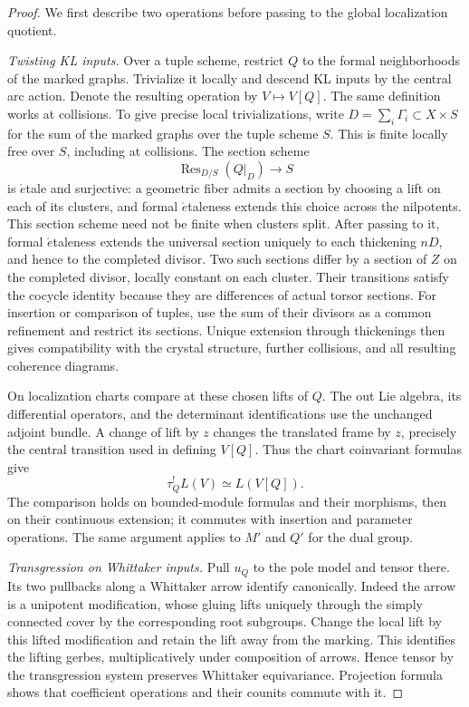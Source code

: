 \begin{proof}
We first describe two operations before passing to the global
localization quotient.

\emph{Twisting KL inputs.}
Over a tuple scheme, restrict \(Q\) to the formal neighborhoods of
the marked graphs.  Trivialize it locally and descend KL inputs by the
central arc action.  Denote the resulting operation by \(V\mapsto
V[Q]\).  The same definition works at collisions.  To give precise local
trivializations, write \(D=\sum_i\Gamma_i\subset X\times S\)
for the sum of the marked graphs over the tuple scheme \(S\).
This is finite locally free over \(S\), including at collisions.
The section scheme
\[
 \operatorname{Res}_{D/S}(Q|_D)\longrightarrow S
\]
is \(\acute{e}\)tale and surjective: a geometric fiber admits a
section by choosing a lift on each of its clusters, and formal
\(\acute{e}\)taleness extends this choice across the nilpotents.
This section scheme need not be finite when clusters split.
After passing to it, formal \(\acute{e}\)taleness extends the
universal section uniquely to each thickening \(nD\), and hence
to the completed divisor.  Two such sections differ by a section
of \(Z\) on the completed divisor, locally constant on each
cluster.  Their transitions satisfy the cocycle identity because
they are differences of actual torsor sections.  For insertion or
comparison of tuples, use the sum of their divisors as a common
refinement and restrict its sections.  Unique extension through
thickenings then gives compatibility with the crystal structure,
further collisions, and all resulting coherence diagrams.

On localization charts compare at these chosen lifts of \(Q\).
The out Lie algebra, its differential operators, and the determinant
identifications use the unchanged adjoint bundle.  A change of lift
by \(z\) changes the translated frame by \(z\), precisely the
central transition used in defining \(V[Q]\).  Thus the chart
coinvariant formulas give
\[
 \tau_Q^!L(V)\simeq L(V[Q]).
\]
The comparison holds on bounded-module formulas and their morphisms,
then on their continuous extension; it commutes with insertion and
parameter operations.  The same argument applies to \(M'\) and
\(Q'\) for the dual group.

\emph{Transgression on Whittaker inputs.}
Pull \(u_Q\) to the pole model and tensor there.  Its two pullbacks
along a Whittaker arrow identify canonically.  Indeed the arrow is a
unipotent modification, whose gluing lifts uniquely through the
simply connected cover by the corresponding root subgroups.  Change
the local lift by this lifted modification and retain the lift away
from the marking.  This identifies the lifting gerbes, multiplicatively
under composition of arrows.  Hence tensor by the transgression
system preserves Whittaker equivariance.  Projection formula shows
that coefficient operations and their counits commute with it.


\end{proof}
